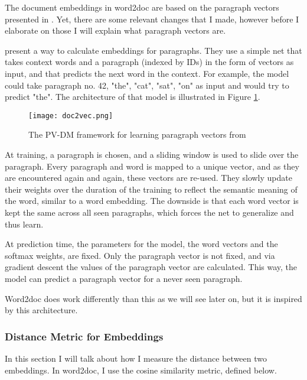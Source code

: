 The document embeddings in word2doc are based on the paragraph vectors presented in \citet{doc2vec}. Yet, there are some relevant
changes that I made, however before I elaborate on those I will explain what paragraph vectors are.

\citet{doc2vec} present a way to calculate embeddings for paragraphs. They use a simple net that takes context words and a
paragraph (indexed by IDs) in the form of vectors as input, and that predicts the next word in the context. For example, the model
could take paragraph no. 42, "the", "cat", "sat", "on" as input and would try to predict "the". The architecture of that model is
illustrated in Figure \ref{fig:parvec}.

\begin{figure}
  \begin{center}
    \texttt{[image: doc2vec.png]}
  \end{center}
  \captionsetup{width=.75\linewidth}
  \caption{The PV-DM framework for learning paragraph vectors from \citet{doc2vec}}
  \medskip
  \label{fig:parvec}
\end{figure}

At training, a paragraph is chosen, and a sliding window is used to slide over the paragraph. Every paragraph and word is mapped to
a unique vector, and as they are encountered again and again, these vectors are re-used. They slowly update their weights over the
duration of the training to reflect the semantic meaning of the word, similar to a word embedding. The downside is that each word
vector is kept the same across all seen paragraphs, which forces the net to generalize and thus learn.

At prediction time, the parameters for the model, the word vectors and the softmax weights, are fixed. Only the paragraph vector is
not fixed, and via gradient descent the values of the paragraph vector are calculated. This way, the model can predict a paragraph
vector for a never seen paragraph.

Word2doc does work differently than this as we will see later on, but it is inspired by this architecture.

\subsubsection{Distance Metric for Embeddings}
\label{theory:cosinesim}

In this section I will talk about how I measure the distance between two embeddings. In word2doc, I use the cosine similarity
metric, defined below.

